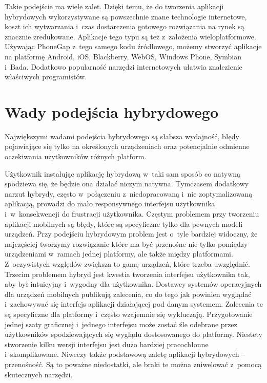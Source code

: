 \documentclass{xmgr}
\begin{document}
Takie podejście ma wiele zalet. Dzięki temu, że do tworzenia aplikacji hybrydowych wykorzystywane są powszechnie znane technologie internetowe, koszt ich wytwarzania i~czas dostarczenia
gotowego rozwiązania na rynek są znacznie zredukowane. Aplikacje tego typu są też
z~założenia wieloplatformowe. Używając PhoneGap z~tego samego kodu źródłowego,
możemy stworzyć aplikacje na platformę Android, iOS, Blackberry, WebOS,
Windows Phone, Symbian i~Bada. Dodatkowo popularność narzędzi internetowych
ułatwia znalezienie właściwych programistów.

\section{Wady podejścia hybrydowego}
Największymi wadami podejścia hybrydowego są słabsza wydajność, błędy
pojawiające się tylko na określonych urządzeniach oraz potencjalnie odmienne oczekiwania użytkowników różnych platform. 

Użytkownik instalując aplikację hybrydową w~taki sam sposób co 
natywną spodziewa się, że będzie ona działać niczym natywna. Tymczasem
dodatkowy narzut hybrydy, często w~połączeniu z~niedopracowaną i~nie
zoptymalizowaną aplikacją, prowadzi do mało responsywnego interfejsu
użytkownika i~w~konsekwencji do frustracji użytkownika. Częstym problemem przy
tworzeniu aplikacji mobilnych są błędy, które są specyficzne tylko dla pewnych modeli urządzeń. Przy podejściu hybrydowym problem jest o~tyle bardziej widoczny, że
najczęściej tworzymy rozwiązanie które ma być przenośne nie tylko pomiędzy urządzeniami w~ramach jednej platformy, ale także między platformami. Z~oczywistych względów zwiększa to gamę urządzeń, które trzeba uwzględnić. Trzecim problemem hybryd jest kwestia
tworzenia interfejsu użytkownika tak, aby był intuicyjny i~wygodny dla użytkownika. Dostawcy systemów operacyjnych dla urządzeń
mobilnych publikują zalecenia, co do tego jak powinien wyglądać i~zachowywać się interfejs aplikacji
działającej pod danym systemem. Zalecenia te są specyficzne dla platformy i~często
wzajemnie się wykluczają. Przygotowanie jednej szaty graficznej i~jednego interfejsu
może zostać źle odebrane przez użytkowników spodziewających się wyglądu
dostosowanego do platformy. Niestety stworzenie kilku wersji interfejsu jest dużo
bardziej pracochłonne i~skomplikowane. Niweczy także podstawową zaletę aplikacji
hybrydowych – przenośność. 
Są to poważne niedostatki, ale braki te można zniwelować z~pomocą skutecznych narzędzi.
\end{document}
